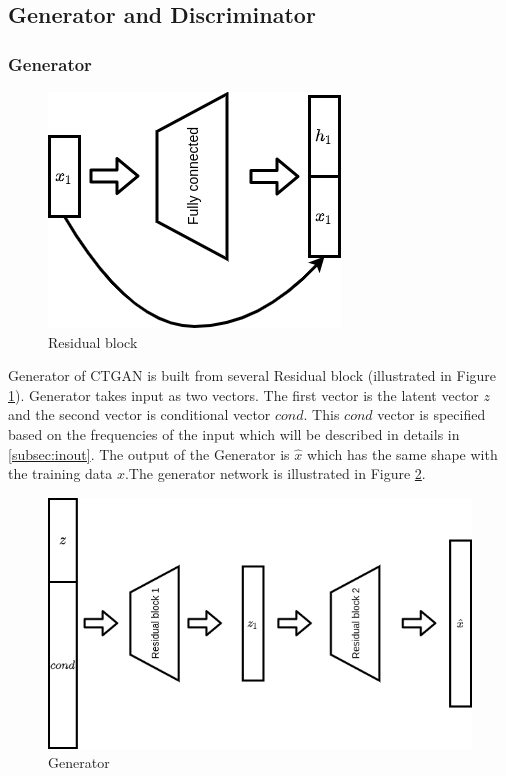 \documentclass{article}
\begin{document}
\subsection{Generator and Discriminator}\label{subsec:gendis}

\subsubsection{Generator}
\begin{figure}[h]
	\centering
	\includegraphics[scale=0.4]{figures/res.png}
	\caption{Residual block}
	\label{fig:res}
\end{figure}

Generator of \ac{CTGAN} is built from several Residual block (illustrated in Figure \ref{fig:res}). Generator takes input as two vectors. The first vector is the latent vector $z$ and the second vector is conditional vector $cond$. This $cond$ vector is specified based on the frequencies of the input which will be described in details in \ref{subsec:inout}. The output of the Generator is $\hat{x}$ which has the same shape with the training data $x$.The generator network is illustrated in Figure \ref{fig:gen}. 

\begin{figure}[h]
	\centering
	\includegraphics[scale=0.4]{figures/gen.png}
	\caption{Generator}
	\label{fig:gen}
\end{figure}
\end{document}
